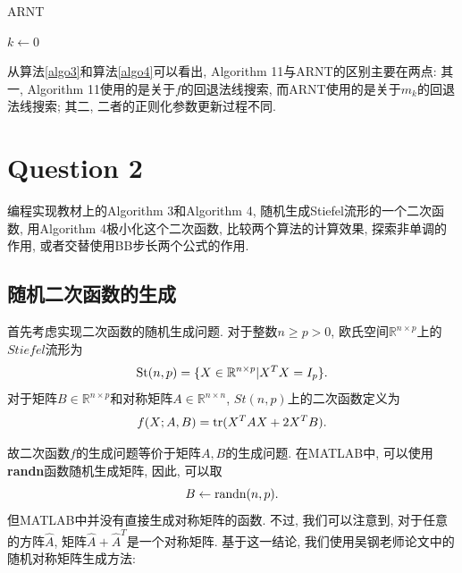 \documentclass[UTF8]{ctexart}
\begin{document}
\begin{algorithm}[htb]
    \caption{ARNT}\label{algo4}
    $k\leftarrow 0$\;
    \While{终止条件不成立}{
        {\color{purple}{使用RNewton}}得到步长$d_k$\;
        初始步长为$1$, 使用{\color{purple}{关于$m_k$}}的回退法线搜索得到步长$t_k$和中间点$y_k=\textbf{R}_{x_k}(t_kd_k)$\;
        计算预测比$\rho_k\leftarrow\frac{f(y_k)-f(x_k)}{m_k(t_k d_k)-f(x_k)}$\;
        更新正则参数: 若$\rho_k\geq \eta_2$, 则{\color{purple}{$\sigma_{k+1}\in(0,\gamma_0\sigma_k]$}}; 若$\eta_2\ge\rho_k\geq \eta_1$, 则{\color{purple}{$\sigma_{k+1}\in[\gamma_0\sigma_k,\gamma_1\sigma_k]$}}; 若$\rho_k\le \eta_1$, 则{\color{purple}{$\sigma_{k+1}\in[\gamma_1\sigma_k,\gamma_2\sigma_k]$}}\; 
        更新迭代点: 若$\rho_k\geq \eta_1$, 则$x_{k+1}\leftarrow y_k$; 若$\rho_k\le \eta_1$, 则$x_{k+1}\leftarrow x_k$\; 
        $k\leftarrow k+1$\;
    }
\end{algorithm}

从算法\ref{algo3}和算法\ref{algo4}可以看出, Algorithm 11与ARNT的区别主要在两点: 其一, Algorithm 11使用的是关于$f$的回退法线搜索, 而ARNT使用的是关于$m_k$的回退法线搜索; 其二, 二者的正则化参数更新过程不同. 

\section{Question 2}

编程实现教材上的Algorithm 3和Algorithm 4, 随机生成Stiefel流形的一个二次函数, 用Algorithm 4极小化这个二次函数, 比较两个算法的计算效果, 探索非单调的作用, 或者交替使用BB步长两个公式的作用. 

\subsection{随机二次函数的生成}

首先考虑实现二次函数的随机生成问题. 对于整数$n\geq p>0$, 欧氏空间$\mathbb{R}^{n\times p}$上的$Stiefel$流形为
\[\textup{St}(n,p)=\{X\in\mathbb{R}^{n\times p}|X^T X=I_p\}.\]
对于矩阵$B\in \mathbb{R}^{n\times p}$和对称矩阵$A\in\mathbb{R}^{n\times n}$, $St(n,p)$上的二次函数定义为
\[f(X;A,B)=\textup{tr}(X^T AX+2X^T B).\]

故二次函数$f$的生成问题等价于矩阵$A,B$的生成问题. 在MATLAB中, 可以使用\textbf{randn}函数随机生成矩阵, 因此, 可以取
\[B\leftarrow \textup{randn}(n,p).\]
但MATLAB中并没有直接生成对称矩阵的函数. 不过, 我们可以注意到, 对于任意的方阵$\hat{A}$, 矩阵$\hat{A}+\hat{A}^T$是一个对称矩阵. 基于这一结论, 我们使用吴钢老师论文中的随机对称矩阵生成方法: 
\end{document}
